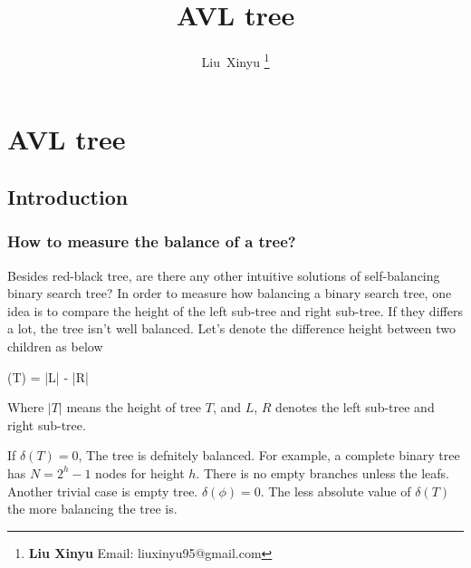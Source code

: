 \documentclass{article}
\begin{document}
\fi


\title{AVL tree}

\author{Liu~Xinyu
\thanks{{\bfseries Liu Xinyu } \newline
  Email: liuxinyu95@gmail.com \newline}
  }


\maketitle

\ifx\wholebook\relax
\chapter{AVL tree}
\fi

\section{Introduction}
\label{introduction} 

\subsection{How to measure the balance of a tree?}
Besides red-black tree, are there any other intuitive solutions of self-balancing
binary search tree? In order to measure how balancing a binary search tree,
one idea is to compare the height of the left sub-tree and right sub-tree.
If they differs a lot, the tree isn't well balanced. Let's denote the 
difference height between two children as below

\be
  \delta(T) = |L| - |R|
\ee

Where $|T|$ means the height of tree $T$, and $L$, $R$ denotes the left
sub-tree and right sub-tree.

If $\delta(T) = 0$, The tree is defnitely balanced. For example, a 
complete binary tree has $N=2^h-1$ nodes for height $h$. There is
no empty branches unless the leafs. Another trivial case is empty 
tree. $\delta(\phi) = 0$. The less absolute value of $\delta(T)$
the more balancing the tree is. 
\end{document}
